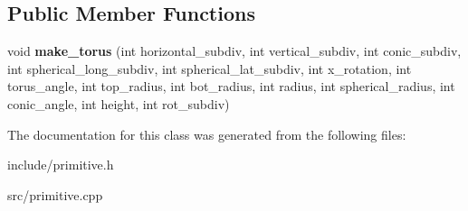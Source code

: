 \subsection*{Public Member Functions}
\begin{DoxyCompactItemize}
\item 
\mbox{\label{classtorus_ae796ce1ae79a0d4283f7172f1fbef8b1}} 
void {\bfseries make\+\_\+torus} (int horizontal\+\_\+subdiv, int vertical\+\_\+subdiv, int conic\+\_\+subdiv, int spherical\+\_\+long\+\_\+subdiv, int spherical\+\_\+lat\+\_\+subdiv, int x\+\_\+rotation, int torus\+\_\+angle, int top\+\_\+radius, int bot\+\_\+radius, int radius, int spherical\+\_\+radius, int conic\+\_\+angle, int height, int rot\+\_\+subdiv)
\end{DoxyCompactItemize}


The documentation for this class was generated from the following files\+:\begin{DoxyCompactItemize}
\item 
include/primitive.\+h\item 
src/primitive.\+cpp\end{DoxyCompactItemize}
